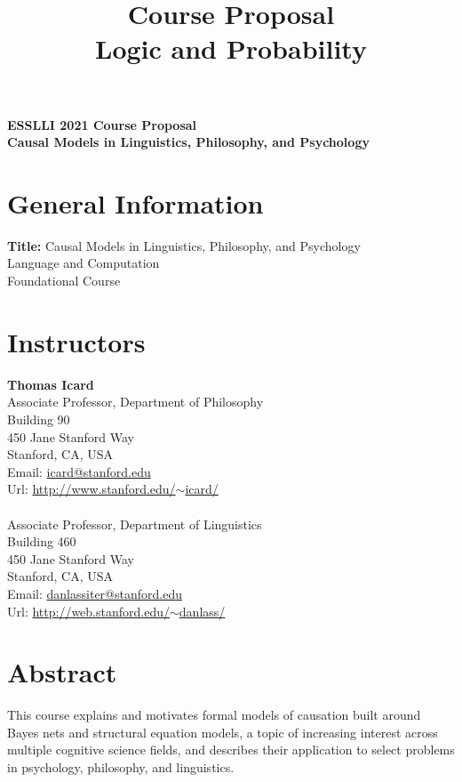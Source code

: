 \documentclass[english]{article}
\begin{document}
\title{\Large{ Course Proposal} \\ \Large{\bf Logic and Probability}}
\author{}
\date{}

\noindent \Large{\bf ESSLLI 2021 Course Proposal} \\ \large{\bf Causal Models in Linguistics, Philosophy, and Psychology} 

\section*{\large{General Information}}

\normalsize{{\bf Title:} Causal Models in Linguistics, Philosophy, and Psychology \\
 Language and Computation \\
 Foundational Course}

\section*{\large{Instructors}}

\normalsize{ {\bf Thomas Icard}\\
Associate Professor, Department of Philosophy \\
Building 90 \\
450 Jane Stanford Way \\
Stanford, CA, USA \\
Email: \href{icard@stanford.edu}{icard@stanford.edu}\\
Url: \href{http://www.stanford.edu/~icard/}{http://www.stanford.edu/$\sim$icard/} \\

\\
Associate Professor, Department of Linguistics \\
Building 460 \\
450 Jane Stanford Way \\
Stanford, CA, USA \\
Email: \href{danlassiter@stanford.edu}{danlassiter@stanford.edu}\\
Url: \href{http://web.stanford.edu/~danlass/}{http://web.stanford.edu/$\sim$danlass/}}

\section*{\large{Abstract}}

This course explains and motivates formal models of causation built around Bayes nets and structural equation models, a topic of increasing interest across multiple cognitive science fields, and describes their application to select problems in psychology, philosophy, and linguistics. 
\end{document}
